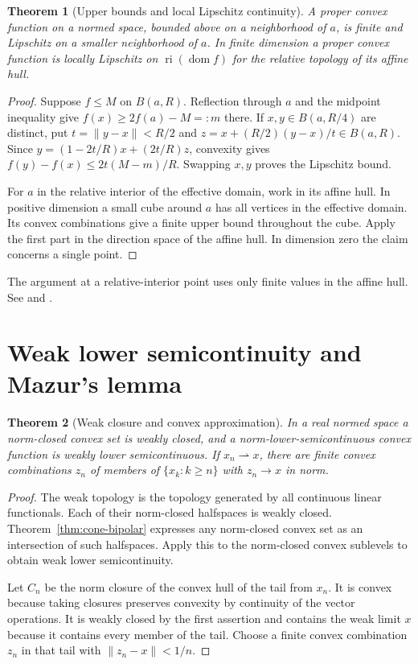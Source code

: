 \documentclass[11pt,oneside,openany]{book}
\theoremstyle{plain}
\newtheorem{theorem}{Theorem}[chapter]
\theoremstyle{definition}
\theoremstyle{remark}
\begin{document}
\begin{theorem}[Upper bounds and local Lipschitz continuity]
\label{thm:convex-local-lipschitz}
A proper convex function on a normed space, bounded above on
a neighborhood of \(a\), is finite and Lipschitz on a smaller
neighborhood of \(a\). In finite dimension a proper convex
function is locally Lipschitz on \(\operatorname{ri}(\operatorname{dom}f)\)
for the relative topology of its affine hull.
\end{theorem}

\begin{proof}
Suppose \(f\le M\) on \(B(a,R)\). Reflection through \(a\)
and the midpoint inequality give
\(f(x)\ge 2f(a)-M=:m\) there. If \(x,y\in B(a,R/4)\)
are distinct, put \(t=\lVert y-x\rVert<R/2\) and
\(z=x+(R/2)(y-x)/t\in B(a,R)\).
Since \(y=(1-2t/R)x+(2t/R)z\), convexity gives
\(f(y)-f(x)\le 2t(M-m)/R\). Swapping \(x,y\)
proves the Lipschitz bound.

For \(a\) in the relative interior of the effective domain,
work in its affine hull. In positive dimension a small cube
around \(a\) has all vertices in the effective domain. Its
convex combinations give a finite upper bound throughout
the cube. Apply the first part in the direction space of the
affine hull. In dimension zero the claim concerns a single
point.
\end{proof}

The argument at a relative-interior point uses only finite
values in the affine hull. See \cite[Theorem 10.1]{Rockafellar}
and \cite[Chapter I, \S2]{EkelandTemam}.

\section{Weak lower semicontinuity and Mazur's lemma}
\label{v02-03}

\begin{theorem}[Weak closure and convex approximation]
\label{thm:convex-weak-closed}
In a real normed space a norm-closed convex set is weakly
closed, and a norm-lower-semicontinuous convex function is
weakly lower semicontinuous. If \(x_n\rightharpoonup x\),
there are finite convex combinations \(z_n\) of members of
\(\{x_k:k\ge n\}\) with \(z_n\to x\) in norm.
\end{theorem}

\begin{proof}
The weak topology is the topology generated by all continuous
linear functionals. Each of their norm-closed halfspaces is
weakly closed. Theorem~\ref{thm:cone-bipolar} expresses any
norm-closed convex set as an intersection of such halfspaces.
Apply this to the norm-closed convex sublevels to obtain
weak lower semicontinuity.

Let \(C_n\) be the norm closure of the convex hull of the tail
from \(x_n\). It is convex because taking closures preserves
convexity by continuity of the vector operations. It is weakly
closed by the first assertion and contains the weak limit \(x\)
because it contains every member of the tail.
Choose a finite convex combination \(z_n\) in that tail with
\(\lVert z_n-x\rVert<1/n\).
\end{proof}
\end{document}
